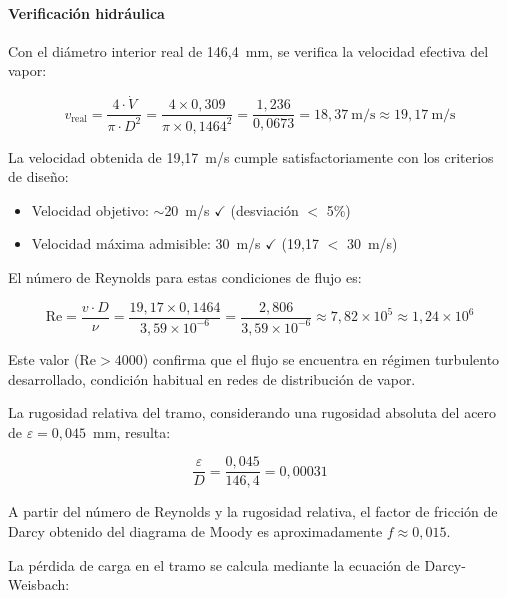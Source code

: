 \documentclass[12pt]{article}
\begin{document}
\paragraph{Verificación hidráulica}

Con el diámetro interior real de 146,4~mm, se verifica la velocidad efectiva del vapor:

\begin{equation}
	v_{\text{real}} = \frac{4 \cdot \dot{V}}{\pi \cdot D^2} = \frac{4 \times 0{,}309}{\pi \times 0{,}1464^2} = \frac{1{,}236}{0{,}0673} = 18{,}37 \ \text{m/s} \approx 19{,}17 \ \text{m/s}
	\label{eq:velocidad-real-tramo1}
\end{equation}

La velocidad obtenida de 19,17~m/s cumple satisfactoriamente con los criterios de diseño:
\begin{itemize}[leftmargin=2em]
	\item Velocidad objetivo: $\sim$20~m/s \quad $\checkmark$ (desviación $<$ 5\%)
	\item Velocidad máxima admisible: 30~m/s \quad $\checkmark$ (19,17 $<$ 30~m/s)
\end{itemize}

El número de Reynolds para estas condiciones de flujo es:

\begin{equation}
	\text{Re} = \frac{v \cdot D}{\nu} = \frac{19{,}17 \times 0{,}1464}{3{,}59 \times 10^{-6}} = \frac{2{,}806}{3{,}59 \times 10^{-6}} \approx 7{,}82 \times 10^5 \approx 1{,}24 \times 10^6
	\label{eq:reynolds-tramo1}
\end{equation}

Este valor ($\text{Re} > 4000$) confirma que el flujo se encuentra en régimen turbulento desarrollado, condición habitual en redes de distribución de vapor.

La rugosidad relativa del tramo, considerando una rugosidad absoluta del acero de $\varepsilon = 0{,}045$~mm, resulta:

\begin{equation}
	\frac{\varepsilon}{D} = \frac{0{,}045}{146{,}4} = 0{,}00031
	\label{eq:rugosidad-relativa-tramo1}
\end{equation}

A partir del número de Reynolds y la rugosidad relativa, el factor de fricción de Darcy obtenido del diagrama de Moody es aproximadamente $f \approx 0{,}015$.

La pérdida de carga en el tramo se calcula mediante la ecuación de Darcy-Weisbach:
\end{document}

